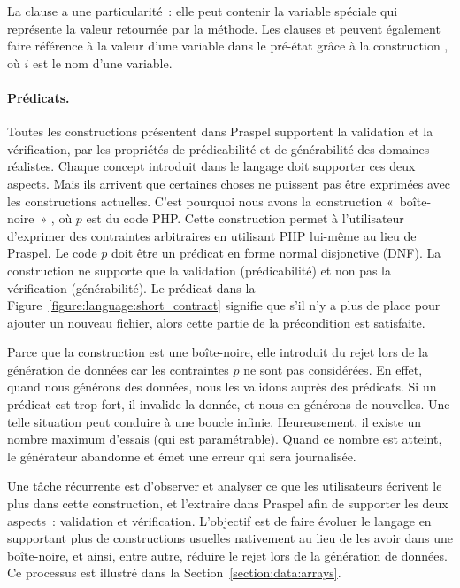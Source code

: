 La clause \aensures a une particularité~: elle peut contenir la variable
spéciale \aresult qui représente la valeur {\strong retournée} par la méthode.
Les clauses \aensures et \athrowable peuvent également faire {\strong référence}
à la valeur d'une variable dans le pré-état grâce à la construction , où
$i$ est le nom d'une variable.

\paragraph{Prédicats.} Toutes les constructions présentent dans Praspel
supportent la validation et la vérification, \ie par les propriétés de
prédicabilité et de générabilité des domaines réalistes. Chaque concept
introduit dans le langage doit supporter ces deux aspects. Mais ils arrivent que
certaines choses ne puissent pas être exprimées avec les constructions
actuelles. C'est pourquoi nous avons la construction «~boîte-noire~» ,
où $p$ est du code PHP. Cette construction permet à l'utilisateur d'exprimer des
contraintes arbitraires en utilisant PHP lui-même au lieu de Praspel. Le code
$p$ doit être un prédicat en forme normal {\strong disjonctive} (DNF). La
construction  ne supporte que la validation (prédicabilité) et non pas
la vérification (générabilité). Le prédicat  dans la
Figure~\ref{figure:language:short_contract} signifie que s'il n'y a plus de
place pour ajouter un nouveau fichier, alors cette partie de la précondition est
satisfaite.

Parce que la construction  est une boîte-noire, elle introduit du rejet
lors de la génération de données car les contraintes $p$ ne sont pas
considérées. En effet, quand nous générons des données, nous les validons auprès
des prédicats. Si un prédicat est trop fort, il invalide la donnée, et nous en
générons de nouvelles. Une telle situation peut conduire à une boucle infinie.
Heureusement, il existe un nombre maximum d'essais (qui est paramétrable). Quand
ce nombre est atteint, le générateur abandonne et émet une erreur qui sera
journalisée.

Une tâche récurrente est d'observer et analyser ce que les utilisateurs écrivent
le plus dans cette construction, et l'extraire dans Praspel afin de supporter
les deux aspects~: validation et vérification. L'objectif est de faire évoluer
le langage en supportant plus de constructions usuelles nativement au lieu de
les avoir dans une boîte-noire, et ainsi, entre autre, réduire le rejet lors de
la génération de données. Ce processus est illustré dans la
Section~\ref{section:data:arrays}.

